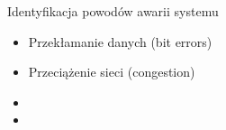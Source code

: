 \documentclass[compress,red]{beamer}
\begin{document}
\begin{frame}{Identyfikacja powodów awarii systemu}


  \begin{itemize}
    \item Przekłamanie danych (bit errors)
    \item Przeciążenie sieci (congestion)
    \item {}
    \item \color{black}{Zbyt długi czas transmisji (exceeding upper bound latency)}
  \end{itemize}

\end{frame}
\end{document}
